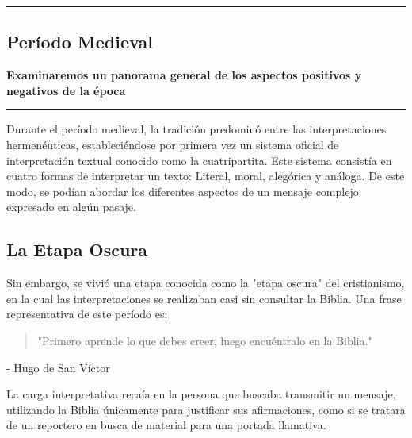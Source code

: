 {\color{gray}\hrule}
\begin{center}
\section{Período Medieval}
\textbf{Examinaremos un panorama general de los aspectos positivos y negativos de la época}
\end{center}
{\color{gray}\hrule}
\begin{multicols}{2}

Durante el período medieval, la tradición predominó entre las interpretaciones hermenéuticas, estableciéndose por primera vez un sistema oficial de interpretación textual conocido como la cuatripartita. Este sistema consistía en cuatro formas de interpretar un texto: Literal, moral, alegórica y análoga. De este modo, se podían abordar los diferentes aspectos de un mensaje complejo expresado en algún pasaje.

\subsection{La Etapa Oscura}

Sin embargo, se vivió una etapa conocida como la "etapa oscura" del cristianismo, en la cual las interpretaciones se realizaban casi sin consultar la Biblia. Una frase representativa de este período es:

\begin{quote}
"Primero aprende lo que debes creer, luego encuéntralo en la Biblia."
\end{quote}
\begin{flushright}
- Hugo de San Víctor
\end{flushright}

La carga interpretativa recaía en la persona que buscaba transmitir un mensaje, utilizando la Biblia únicamente para justificar sus afirmaciones, como si se tratara de un reportero en busca de material para una portada llamativa.

\end{multicols}
